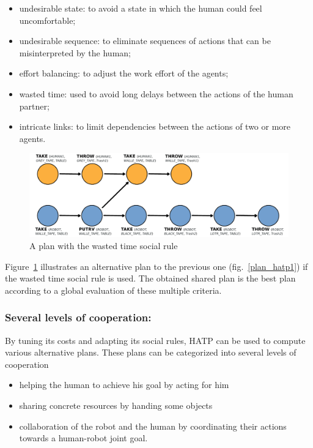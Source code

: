 \documentclass{svmult}
\begin{document}
\begin{itemize}
\item undesirable state: to avoid a state in which the human could
  feel uncomfortable;
\item undesirable sequence: to eliminate sequences of actions that can
  be misinterpreted by the human;
\item effort balancing: to adjust the work effort of the agents;
\item wasted time: used to avoid long delays between the actions of
  the human partner;
\item intricate links: to limit dependencies between the actions of
  two or more agents.
\end{itemize}

\begin{figure}[htbp]
  \centering
  \includegraphics[width=0.95\columnwidth]{./figs/plan2.pdf}
  \caption{A plan with the wasted time social rule}
  \label{plan_hatp2}
\end{figure}

Figure~\ref{plan_hatp2} illustrates an alternative plan to the previous 
one (fig.~\ref{plan_hatp1}) if the wasted time social rule is used.
The obtained shared plan is the best plan according to a global evaluation of
these multiple criteria.

\subsubsection{Several levels of cooperation:} 

By tuning its costs
and adapting its social rules, HATP can be used to compute various
alternative plans. These plans can be categorized into several levels
of cooperation

\begin{itemize}
\item helping the human to achieve his goal by acting for him
\item sharing concrete resources by handing some objects
\item collaboration of the robot and the human by coordinating their
  actions towards a human-robot joint goal.
\end{itemize}
\end{document}
